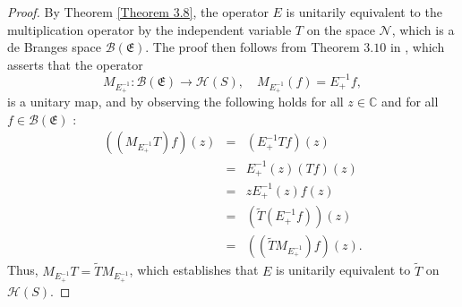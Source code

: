 \documentclass [12pt,reqno]{amsart}
\numberwithin{equation}{subsection}
\numberwithin{equation}{section}
\begin{document}
\begin{proof}
By Theorem \ref{Theorem 3.8}, the operator $E$ is unitarily equivalent to the multiplication operator by the independent variable $T$ on the space $\mathcal{N}$, which is a de Branges space $\mathcal{B}(\mathfrak{E})$. The proof then follows from Theorem $3.10$ in \cite{multi}, which asserts that the operator $$M_{E_+^{-1}}: \mathcal{B}(\mathfrak{E}) \rightarrow \mathcal{H}(S),  \quad M_{E_+^{-1}}(f) = E_+^{-1}f,$$ is a unitary map, and by observing the following holds for all $z \in \mathbb{C}$ and for all $f \in \mathcal{B}(\mathfrak{E})$ :
\begin{eqnarray*}
 ((M_{E_+^{-1}}T)f)(z) &=&(E_+^{-1}Tf)(z) \\
                &=& E_+^{-1}(z)(Tf)(z)\\
                &=& zE_+^{-1}(z)f(z)\\
                &=&(\tilde{T}(E_+^{-1}f))(z)\\
                &=&((\tilde{T}M_{E_+^{-1}})f)(z).
\end{eqnarray*}
Thus, \( M_{E_+^{-1}} T = \tilde{T} M_{E_+^{-1}} \), which establishes that \( E \) is unitarily equivalent to \( \tilde{T} \) on \( \mathcal{H}(S) \).
\end{proof}
\end{document}
